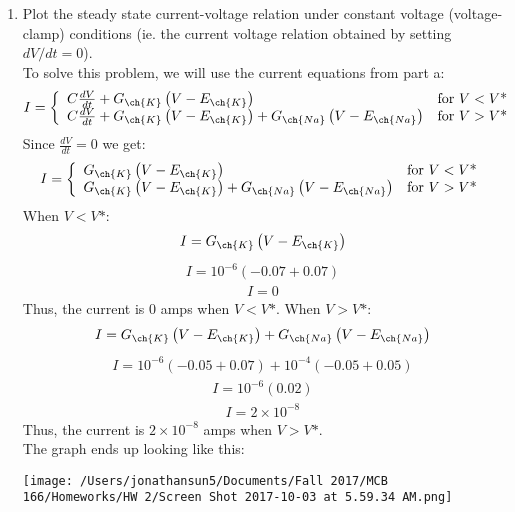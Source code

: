 \documentclass[11pt]{article}
\begin{document}
\begin{enumerate}[label=\arabic*.]
\begin{enumerate}[label=(\alph*)]
\newpage
\item
Plot the steady state current-voltage relation under constant voltage (voltage-clamp) conditions (ie. the current voltage relation obtained by setting $dV / dt = 0$).
\vspace*{1\baselineskip}
\\
To solve this problem, we will use the current equations from part a:
\begin{align*}
I = \left\{
\begin{array}{ll}
	C \frac{dV} {dt} + G_{\ch{K}} \left(V - E_{\ch{K}}\right) & \text{for } V < V\text{*} \\
	C \frac{dV} {dt} + G_{\ch{K}} \left(V - E_{\ch{K}}\right) + G_{\ch{Na}} \left(V - E_{\ch{Na}}\right) & \text{for } V > V\text{*} \\
\end{array}
\right.
\end{align*}
Since $\frac{dV} {dt} = 0$ we get:
\begin{align*}
I = \left\{
\begin{array}{ll}
	G_{\ch{K}} \left(V - E_{\ch{K}}\right) & \text{for } V < V\text{*} \\
	G_{\ch{K}} \left(V - E_{\ch{K}}\right) + G_{\ch{Na}} \left(V - E_{\ch{Na}}\right) & \text{for } V > V\text{*} \\
\end{array}
\right.
\end{align*}
When $V < V\text{*}$:
\begin{align*}
I = G_{\ch{K}} \left(V - E_{\ch{K}}\right)
\end{align*}
\begin{align*}
I = 10^{-6} \left(-0.07 + 0.07\right)
\end{align*}
\begin{align*}
I = 0
\end{align*}
Thus, the current is $0$ amps when $V < V\text{*}$.
When $V > V\text{*}$:
\begin{align*}
I = G_{\ch{K}} \left(V - E_{\ch{K}}\right) + G_{\ch{Na}} \left(V - E_{\ch{Na}}\right)
\end{align*}
\begin{align*}
I = 10^{-6} \left(-0.05 + 0.07\right) + 10^{-4} \left(-0.05 + 0.05\right)
\end{align*}
\begin{align*}
I = 10^{-6} \left(0.02\right)
\end{align*}
\begin{align*}
I = 2 \times 10^{-8}
\end{align*}
Thus, the current is $2 \times 10^{-8}$ amps when $V > V\text{*}$.
\vspace*{1\baselineskip}
\\
The graph ends up looking like this:
\begin{center}
\texttt{[image: /Users/jonathansun5/Documents/Fall 2017/MCB 166/Homeworks/HW 2/Screen Shot 2017-10-03 at 5.59.34 AM.png]}
\end{center}
\end{enumerate}




\end{enumerate}
\end{document}
